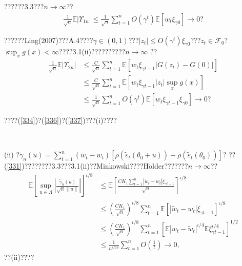 \documentclass[a4paper,12pt,openany,oneside,utf-8]{ctexbook}
\begin{document}
	\noindent ??????3.3???$n \rightarrow \infty$??
	\begin{align}\label{336}
		\frac{1}{\sqrt{n}} \mathbb{E}\left|\Upsilon_{1 n}\right| \leq \frac{1}{\sqrt{n}} \sum_{t=1}^{n} O\left(\gamma^{t}\right) \mathbb{E}\left[w_{t} \xi_{\gamma 0}\right] \rightarrow 0\mbox{?}
	\end{align}
	
	??????Ling(2007)???A.4????$\gamma\in(0,1)$???$\left|z_t\right|\le O(\gamma^t)\xi_{\gamma 0}$???$z_{t} \in \mathcal{F}_{0}$?$\sup _{x} g(x)<\infty$????3.1(ii)??????????$n \rightarrow \infty$ ??
	\begin{align}\label{337}
		\frac{1}{\sqrt{n}} \mathbb{E}\left|\Upsilon_{2 n}\right|
		&\le \frac{C}{\sqrt{n}} \sum_{t=1}^{n} \mathbb{E}\left[w_{t} \xi_{\gamma t-1}\left|G\left(z_{t}\right)-G(0)\right|\right]\nonumber\\
		&\le \frac{C}{\sqrt{n}} \sum_{t=1}^{n} \mathbb{E}\left[w_{t} \xi_{\gamma t-1}\left|z_t\right|\sup_xg(x)\right]\nonumber\\
		&\le \frac{1}{\sqrt{n}} \sum_{t=1}^{n} O\left(\gamma^{t}\right) \mathbb{E}\left[w_{t} \xi_{\gamma t-1} \xi_{\gamma 0}\right] \rightarrow 0\mbox{?}
	\end{align}
	
	\noindent ????(\ref{334})?(\ref{336})?(\ref{337})???(i)????
	
	\
	
	\noindent (ii) ?$\tilde{\gamma}_{n}(u)=\sum_{t=1}^{n}\left(\tilde{w}_{t}-w_{t}\right)\left[\rho\left(\tilde{\varepsilon}_{t}\left(\theta_{0}+u\right)\right)-\rho\left(\tilde{\varepsilon}_{t}\left(\theta_{0}\right)\right)\right]$? ??(\ref{331})????????3.3???3.1(ii)??Minkowski????H$\ddot{\mathrm{o}}$lder???????$n \rightarrow \infty$??
	\begin{align}
		\mathbb{E}\left[\sup _{u \in \Lambda}\left|\frac{\tilde{\gamma}_{n}(u)}{\sqrt{n}\|u\|}\right|\right]^{\iota / 8}&\le \mathbb{E}\left[\frac{CK_1\sum_{t=1}^{n}\left|\tilde{w}_{t}-w_{t}\right|\xi_{\gamma t-1}}{\sqrt{n}}\right]^{\iota/8}\nonumber\\
		&\le \left(\frac{CK_1}{\sqrt{n}}\right)^{\iota/8}\sum_{t=1}^n\mathbb{E}\left[\left|\tilde{w}_{t}-w_{t}\right|\xi_{\gamma t-1}\right]^{\iota/8}\nonumber\\
		&\le \left(\frac{CK_1}{\sqrt{n}}\right)^{\iota/8}\sum_{t=1}^n\left[\mathbb{E}\left|w_t-\tilde{w}_t\right|^{\iota/4}\mathbb{E}\xi_{\gamma t-1}^{\iota /4}\right]^{1/2}\nonumber\\
		&\le \frac{1}{n^{\iota/ 16}} \sum_{t=1}^{n} O\left(\frac{1}{t}\right) \rightarrow 0,\nonumber
	\end{align}
	??(ii)????
	
\end{document}
